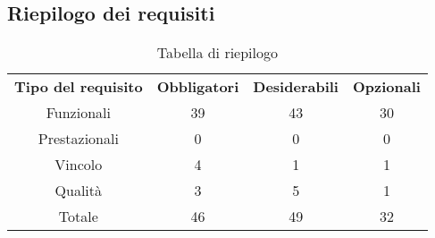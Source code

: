 \subsection{Riepilogo dei requisiti}
\begin{table}[h]
\centering
\begin{tabular}{| c | c | c | c |}
		\rowcolor{LightBlue}
		\color{white}\bfseries Tipo del requisito & \color{white}\bfseries Obbligatori & \color{white}\bfseries Desiderabili & \color{white}\bfseries Opzionali \\[0.25cm]
		 Funzionali & 39 & 43 & 30 \\
		 Prestazionali & 0 & 0 & 0 \\
		 Vincolo & 4 & 1 & 1 \\
		 Qualità & 3 & 5 & 1 \\
		 Totale & 46 & 49 & 32 \\ \hline
\end{tabular}
		\caption{Tabella di riepilogo}
\end{table}


\newpage